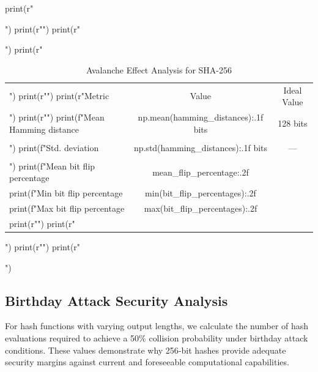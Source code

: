 \documentclass[a4paper, 11pt]{article}
\begin{document}
\begin{pycode}
print(r"\begin{table}[htbp]")
print(r"\centering")
print(r"\caption{Avalanche Effect Analysis for SHA-256}")
print(r"\begin{tabular}{lcc}")
print(r"\toprule")
print(r"Metric & Value & Ideal Value \\")
print(r"\midrule")
print(f"Mean Hamming distance & {np.mean(hamming_distances):.1f} bits & 128 bits \\\\")
print(f"Std. deviation & {np.std(hamming_distances):.1f} bits & --- \\\\")
print(f"Mean bit flip percentage & {mean_flip_percentage:.2f}\\%
print(f"Min bit flip percentage & {min(bit_flip_percentages):.2f}\\%
print(f"Max bit flip percentage & {max(bit_flip_percentages):.2f}\\%
print(r"\bottomrule")
print(r"\end{tabular}")
print(r"\label{tab:avalanche}")
print(r"\end{table}")
\end{pycode}

\subsection{Birthday Attack Security Analysis}

For hash functions with varying output lengths, we calculate the number of hash evaluations
required to achieve a 50\% collision probability under birthday attack conditions. These
values demonstrate why 256-bit hashes provide adequate security margins against current
and foreseeable computational capabilities.
\end{document}
